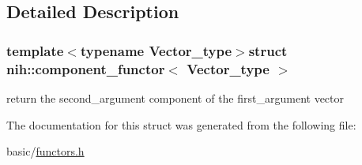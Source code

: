 \subsection{\-Detailed \-Description}
\subsubsection*{template$<$typename Vector\-\_\-type$>$struct nih\-::component\-\_\-functor$<$ Vector\-\_\-type $>$}

return the second\-\_\-argument component of the first\-\_\-argument vector 

\-The documentation for this struct was generated from the following file\-:\begin{DoxyCompactItemize}
\item 
basic/\hyperlink{functors_8h}{functors.\-h}\end{DoxyCompactItemize}
